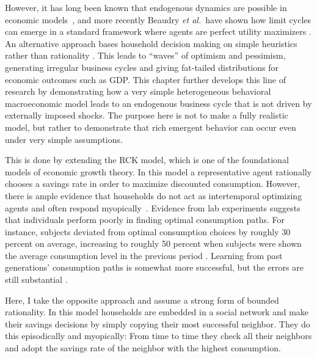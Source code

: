 However, it has long been known that endogenous dynamics are possible in economic models~\citep{day1983emergence,BOLDRIN198626, Scheinkman, boldrin1992equilibrium, boldrin1992sources,blume1992evolution}, and more recently Beaudry \textit{et al.}\ have shown how limit cycles can emerge in a standard framework where agents are perfect utility maximizers \citep{beaudry2015reviving, beaudry2016putting}.  An alternative approach bases household decision making on simple heuristics rather than rationality \citep{DeGrauwe2011,DeGrauwe2010the}.  This leads to ``waves'' of optimism and pessimism, generating irregular business cycles and giving fat-tailed distributions for economic outcomes such as GDP. This chapter further develops this line of research by demonstrating how a very simple heterogeneous behavioral macroeconomic model leads to an endogenous business cycle that is not driven by externally imposed shocks. The purpose here is not to make a fully realistic model, but rather to demonstrate that rich emergent behavior can occur even under very simple assumptions.

This is done by extending the RCK model, which is one of the foundational models of economic growth theory. In this model a representative agent rationally chooses a savings rate in order to maximize discounted consumption.  However, there is ample evidence that households do not act as intertemporal optimizing agents and often respond myopically~\citep{Benartzi1995,Loewenstein2000,Choi2016}.  Evidence from lab experiments suggests that individuals perform poorly in finding optimal consumption paths. For instance, subjects deviated from optimal consumption choices by roughly 30 percent on average, increasing to roughly 50 percent when subjects were shown the average consumption level in the previous period  \citep{carbone2014lifecycle}.  Learning from past generations' consumption paths is somewhat more successful, but the errors are still substantial \citep{ballinger2003precautionary,brown2009learning}.  

Here, I take the opposite approach and assume a strong form of bounded rationality.  In this model households are embedded in a social network and make their savings decisions by simply copying their most successful neighbor. They do this episodically and myopically: From time to time they check all their neighbors and adopt the savings rate of the neighbor with the highest consumption.   

